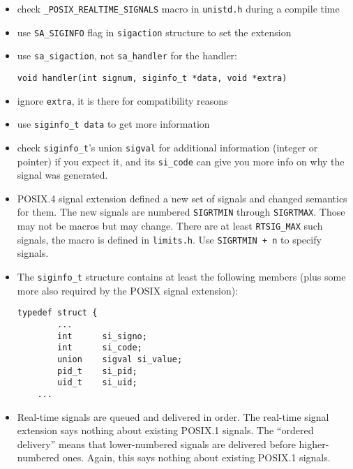 \begin{itemize}
\item check \texttt{\_POSIX\_REALTIME\_SIGNALS} macro in \texttt{unistd.h}
during a compile time
\item use \texttt{SA\_SIGINFO} flag in \texttt{sigaction} structure to set the
extension
\item use \texttt{sa\_sigaction}, not \texttt{sa\_handler} for the handler:
\begin{verbatim}
void handler(int signum, siginfo_t *data, void *extra)
\end{verbatim}
\item ignore \texttt{extra}, it is there for compatibility reasons
\item use \texttt{siginfo\_t data} to get more information
\item check \texttt{siginfo\_t}'s union \texttt{sigval} for additional
information (integer or pointer) if you expect it, and its \texttt{si\_code} can
give you more info on why the signal was generated.
\end{itemize}


\begin{itemize}
\item POSIX.4 signal extension defined a new set of signals and changed
semantics for them. The new signals are numbered \texttt{SIGRTMIN} through
\texttt{SIGRTMAX}. Those may not be macros but may change. There are at least
\texttt{RTSIG\_MAX} such sig\-nals, the macro is defined in \texttt{limits.h}. Use
\texttt{SIGRTMIN + n} to specify signals.
\item The \texttt{siginfo\_t} structure contains at least the following members
(plus some more also required by the POSIX signal extension):
\begin{lstlisting}
typedef struct {
        ...
        int      si_signo;
        int      si_code;
        union    sigval si_value;
        pid_t    si_pid;
        uid_t    si_uid;
	...
\end{lstlisting}

\item Real-time signals are queued and delivered in order. The real-time signal
extension says nothing about existing POSIX.1 signals. The ``ordered delivery''
means that lower-numbered signals are delivered before higher-numbered ones.
Again, this says nothing about existing POSIX.1 signals.
\end{itemize}

